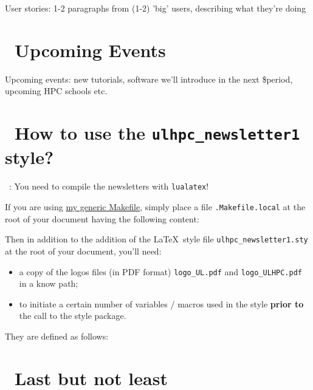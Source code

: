 \documentclass{article}
\begin{document}
User stories: 1-2 paragraphs from (1-2) 'big' users, describing what
they're doing

\section{\faCalendar\ Upcoming Events}
Upcoming events: new tutorials, software we'll introduce in the next
\$period, upcoming HPC schools etc.

\section{\faCogs\ How to use the \texttt{ulhpc\_newsletter1} style?}

\faWarningSign\ : You need to compile the newsletters with \texttt{lualatex}! 

If you are using \href{https://github.com/Falkor/Makefiles/blob/devel/latex/Makefile}{my generic Makefile}, simply place a file \texttt{.Makefile.local} at the root of your document having the following content:



Then in addition to the addition of the \LaTeX\ style file \texttt{ulhpc\_newsletter1.sty} at the root of your document, you'll need: 

\begin{itemize}
  \item a copy of the logos files (in PDF format) \texttt{logo\_UL.pdf} and \texttt{logo\_ULHPC.pdf} in a know path;
  \item to initiate a certain number of variables / macros used in the style \textbf{prior to} the call to the style package.
\end{itemize}

They are defined as follows: 






\section{\faBeer\ Last but not least}

\lipsum[2-8]
\end{document}

